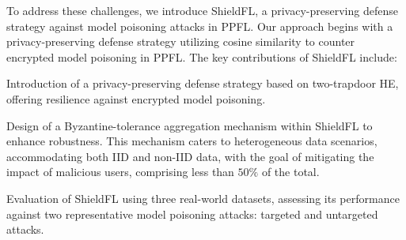 To address these challenges, we introduce ShieldFL, a privacy-preserving defense strategy against model poisoning attacks in PPFL.
Our approach begins with a privacy-preserving defense strategy utilizing cosine similarity to counter encrypted model poisoning in PPFL.
The key contributions of ShieldFL include:
\begin{enumerate*}
    \item Introduction of a privacy-preserving defense strategy based on two-trapdoor HE, offering resilience against encrypted model poisoning.
    \item Design of a Byzantine-tolerance aggregation mechanism within ShieldFL to enhance robustness. This mechanism caters to heterogeneous data scenarios, accommodating both IID and non-IID data, with the goal of mitigating the impact of malicious users, comprising less than $50\%$ of the total.
    \item Evaluation of ShieldFL using three real-world datasets, assessing its performance against two representative model poisoning attacks: targeted and untargeted attacks. 
\end{enumerate*}